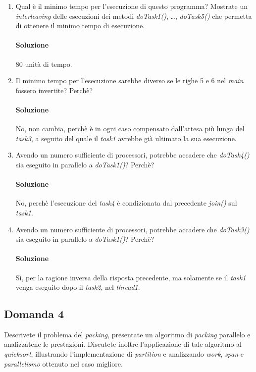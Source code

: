 \begin{enumerate}
	\item Qual è il minimo tempo per l'esecuzione di questo programma? Mostrate un \textit{interleaving} delle esecuzioni dei metodi \textit{doTask1()}, \ldots, \textit{doTask5()} che permetta di ottenere il minimo tempo di esecuzione.
	\paragraph{Soluzione}
	80 unit\`a di tempo.
	\item Il minimo tempo per l'esecuzione sarebbe diverso se le righe 5 e 6 nel \textit{main} fossero invertite? Perch\`e?
	\paragraph{Soluzione}
	No, non cambia, perch\`e \`e in ogni caso compensato dall'attesa pi\`u lunga del \textit{task3}, a seguito del quale il \textit{task1} avrebbe gi\`a ultimato la sua esecuzione.
	\item Avendo un numero sufficiente di processori, potrebbe accadere che \textit{doTask4()} sia eseguito in parallelo a \textit{doTask1()}? Perch\`e?
	\paragraph{Soluzione}
	No, perch\`e l'esecuzione del \textit{task4} \`e condizionata dal precedente \textit{join()} sul \textit{task1}.
	\item Avendo un numero sufficiente di processori, potrebbe accadere che \textit{doTask3()} sia eseguito in parallelo a \textit{doTask1()}? Perch\`e?
	\paragraph{Soluzione}
	S\`i, per la ragione inversa della risposta precedente, ma solamente se il \textit{task1} venga eseguito dopo il \textit{task2}, nel \textit{thread1}.
\end{enumerate}

\newpage

\subsection{Domanda 4}
Descrivete il problema del \textit{packing}, presentate un algoritmo di \textit{packing} parallelo e analizzatene le prestazioni. Discutete inoltre l'applicazione di tale algoritmo al \textit{quicksort}, illustrando l'implementazione di \textit{partition} e analizzando \textit{work}, \textit{span} e \textit{parallelismo} ottenuto nel caso migliore.
